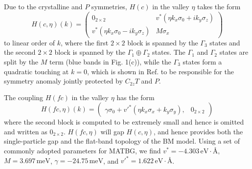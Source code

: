 Due to the crystalline and \( P \) symmetries, \( H(c) \) in the valley \( \eta \) takes the form
\[
H(c,\eta)(k) =
\begin{pmatrix}
0_{2 \times 2} & v^\ast (\eta k_x \sigma_0 + i k_y \sigma_z) \\
v^\ast (\eta k_x \sigma_0 - i k_y \sigma_z) & M \sigma_x
\end{pmatrix}
\]
to linear order of \( k \), where the first \( 2 \times 2 \) block is spanned by the \(\Gamma_3\) states and the second \( 2 \times 2 \) block is spanned by the \(\Gamma_1 \oplus \Gamma_2\) states. The \(\Gamma_1\) and \(\Gamma_2\) states are split by the \( M \) term (blue bands in Fig. 1(c)), while the \(\Gamma_3\) states form a quadratic touching at \( k = 0 \), which is shown in Ref. \cite{115} to be responsible for the symmetry anomaly \cite{104} jointly protected by \( C_{2z}T \) and \( P \).

The coupling \( H(fc) \) in the valley \( \eta \) has the form
\[
H(fc,\eta)(k) =
\begin{pmatrix}
\gamma \sigma_0 + v'^\ast (\eta k_x \sigma_x + k_y \sigma_y), & 0_{2 \times 2}
\end{pmatrix}
\]
where the second block is computed to be extremely small and hence is omitted and written as \( 0_{2 \times 2} \). \( H(fc,\eta) \) will gap \( H(c,\eta) \), and hence provides both the single-particle gap and the flat-band topology of the BM model. Using a set of commonly adopted parameters for MATBG, we find \( v^\ast = -4.303\, \text{eV} \cdot \text{Å} \), \( M = 3.697\, \text{meV} \), \( \gamma = -24.75\, \text{meV} \), and \( v'^\ast = 1.622\, \text{eV} \cdot \text{Å} \).

